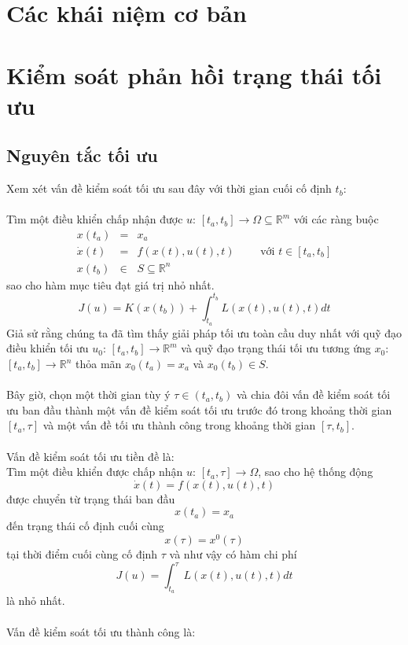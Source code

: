 \documentclass[12pt,a4paper]{report}
\begin{document}
		\tableofcontents
	\chapter{Các khái niệm cơ bản}
	
	
	
	
	\chapter{Kiểm soát phản hồi trạng thái tối ưu}
	\section{Nguyên tắc tối ưu}
	Xem xét vấn đề kiểm soát tối ưu sau đây với thời gian cuối cố định $t_b$:\\\\Tìm một điều khiển chấp nhận được $u$: $[t_a, t_b] \to \Omega \subseteq \mathbb{R}^m$ với các ràng buộc \begin{eqnarray}
		x(t_a) &=& x_a \nonumber \\ \dot{x}(t) &=& f(x(t), u(t), t) \qquad \text{ với } t \in [t_a, t_b] \nonumber \\ x(t_b)&\in& S \subseteq \mathbb{R}^n \nonumber
	\end{eqnarray} sao cho hàm mục tiêu đạt giá trị nhỏ nhất. $$J(u) = K(x(t_b)) + \int_{t_a}^{t_b}L(x(t),u(t), t)dt$$
	Giả sử rằng chúng ta đã tìm thấy giải pháp tối ưu toàn cầu duy nhất với quỹ đạo điều khiển tối ưu $u_0$: $[t_a, t_b] \to \mathbb{R}^m$ và quỹ đạo trạng thái tối ưu tương ứng $x_0$: $[t_a, t_b] \to \mathbb{R}^n$ thỏa mãn $x_0 (t_a) = x_a$ và $x_0(t_b) \in S$.
	\\\\Bây giờ, chọn một thời gian tùy ý $\tau \in(t_a, t_b)$ và chia đôi vấn đề kiểm soát tối ưu ban đầu thành một vấn đề kiểm soát tối ưu trước đó trong khoảng thời gian $[t_a,\tau]$ và một vấn đề tối ưu thành công trong khoảng thời gian $[\tau, t_b]$.\\\\Vấn đề kiểm soát tối ưu tiền đề là:\\Tìm một điều khiển được chấp nhận $u$: $[t_a, \tau] \to \Omega$, sao cho hệ thống động $$\dot{x}(t) = f(x(t),u(t),t)$$ được chuyển từ trạng thái ban đầu $$x(t_a) = x_a$$ đến trạng thái cố định cuối cùng $$x(\tau) = x^0(\tau)$$ tại thời điểm cuối cùng cố định $\tau$ và như vậy có hàm chi phí $$J(u) = \int_{t_a}^{\tau}L(x(t),u(t),t)dt$$ là nhỏ nhất.\\\\Vấn đề kiểm soát tối ưu thành công là:\\
\end{document}
